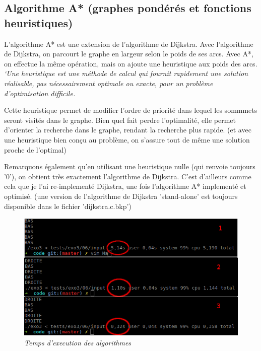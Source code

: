 \documentclass[10pt]{article}
\begin{document}
		\subsection{Algorithme A* (graphes pondérés et fonctions heuristiques)}
			L'algorithme A* est une extension de l'algorithme de Dijkstra.\newline
			Avec l'algorithme de Dijkstra, on parcourt le graphe en largeur selon le poids de ses arcs.
			Avec A*, on effectue la même opération, mais on ajoute une heuristique aux poids des arcs.
			\textit{`Une heuristique est une méthode de calcul qui fournit rapidement une solution réalisable,
			pas nécessairement optimale ou exacte, pour un problème d'optimisation difficile.} \cite{heuristique}\newline
			
			Cette heuristique permet de modifier l'ordre de priorité dans lequel les sommmets seront visités dans le graphe.
			Bien quel fait perdre l'optimalité, elle permet d'orienter la recherche dans le graphe, rendant la recherche plus rapide.
			(et avec une heuristique bien conçu au problème, on s'assure tout de même une solution proche de l'optimal)\newline
			
			Remarquons également qu'en utilisant une heuristique nulle (qui renvoie toujours '0'),
			on obtient très exactement l'algorithme de Dijkstra. C'est d'ailleurs comme cela que je l'ai re-implementé
			Dijkstra, une fois l'algorithme A* implementé et optimisé.
			(une version de l'algorithme de Dijkstra 'stand-alone' est toujours disponible dans le fichier 'dijkstra.c.bkp')
	
			\begin{figure}
				\begin{center}
					\includegraphics[width=12cm,height=\textheight,keepaspectratio]{./images/performances.png}
				\end{center}
				\caption{\textit{Temps d'execution des algorithmes}}
			\end{figure}
			
\end{document}

